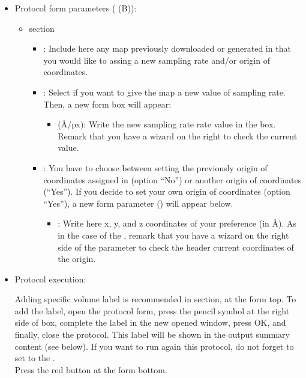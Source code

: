 \begin{itemize}
  \item Protocol form parameters ( (B)):
  
  \begin{itemize}
   \item {} section
  

  \begin{itemize}
   \item {}: Include here any map previously downloaded or generated in \scipion that you would like to assing a new sampling rate and/or origin of coordinates.
   \item {}: Select  if you want to give the map a new value of sampling rate. Then, a new form box will appear:
    \begin{itemize}
    \item {} (\AA/px): Write the new sampling rate rate value in the box. Remark that you have a wizard on the right to check the current value.
    \end{itemize}
   \item {}: You have to choose between setting the previously origin of coordinates assigned in \scipion (option ``No'') or another origin of coordinates (``Yes''). If you decide to set your own origin of coordinates (option ``Yes''), a new form parameter () will appear below.
    \begin{itemize}
   \item {}: Write here x, y, and z coordinates of your preference (in \AA). As in the case of the , remark that you have a wizard on the right side of the parameter to check the header current coordinates of the origin. 
    \end{itemize}
   \end{itemize}
   
  
  \end{itemize}
  \item Protocol execution:
  
  Adding specific volume label is recommended in  section, at the form top. To add the label, open the protocol form, press the pencil symbol at the right side of  box, complete the label in the new opened window, press OK, and finally, close the protocol. This label will be shown in the output summary content (see below). If you want to run again this protocol, do not forget to set to  the .\\
  Press the  red button at the form bottom.
  

\end{itemize}
